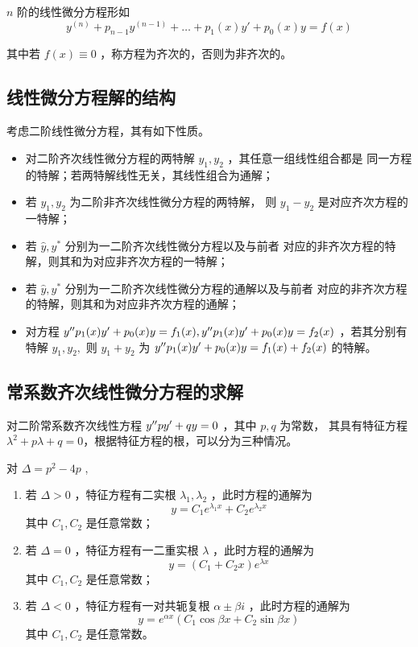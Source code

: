 $ n $ 阶的线性微分方程形如$$
    y^{(n)}+p_{n-1}y^{(n-1)} + \dots + p_1(x)y'+p_0(x)y = f(x)
$$ 

其中若 $ f(x)\equiv 0 $ ，称方程为齐次的，否则为非齐次的。

\subsection{线性微分方程解的结构}

考虑二阶线性微分方程，其有如下性质。

\begin{itemize}
    \item 对二阶齐次线性微分方程的两特解 $ y_1,y_2 $ ，其任意一组线性组合都是
    同一方程的特解；若两特解线性无关，其线性组合为通解；
    \item 若 $ y_1,y_2 $ 为二阶非齐次线性微分方程的两特解，
    则 $ y_1-y_2 $ 是对应齐次方程的一特解；
    \item 若 $ \hat y,y^* $ 分别为一二阶齐次线性微分方程以及与前者
    对应的非齐次方程的特解，则其和为对应非齐次方程的一特解；
    \item 若 $ \hat y,y^* $ 分别为一二阶齐次线性微分方程的通解以及与前者
    对应的非齐次方程的特解，则其和为对应非齐次方程的通解；
    \item 对方程 $ y^{\prime\prime} p_1(x)y'+p_0(x)y = f_1(x),y^{\prime\prime} p_1(x)y'+p_0(x)y = f_2(x) $
    ，若其分别有特解 $ y_1,y_2, $ 则 $ y_1+y_2 $ 为 $ y^{\prime\prime} p_1(x)y'+p_0(x)y = f_1(x)+f_2(x) $ 的特解。
\end{itemize}

\subsection{常系数齐次线性微分方程的求解}

对二阶常系数齐次线性方程 $ y^{\prime\prime} py'+qy = 0 $ ，其中 $ p,q $ 为常数，
其具有特征方程 $ \lambda^2+p\lambda+q = 0 $，根据特征方程的根，可以分为三种情况。

对 $ \Delta = p^2 - 4p $ ,
\begin{enumerate}
    \item 若 $ \Delta > 0 $ ，特征方程有二实根 $ \lambda_1,\lambda_2 $ ，此时方程的通解为$$
        y = C_1e^{\lambda_1x}+C_2e^{\lambda_2x}
    $$ 其中 $ C_1,C_2 $ 是任意常数；
    \item 若 $ \Delta = 0 $ ，特征方程有一二重实根 $ \lambda $ ，此时方程的通解为$$
        y = (C_1+C_2 x)e^{\lambda x}
    $$ 其中 $ C_1,C_2 $ 是任意常数；
    \item 若 $ \Delta < 0 $ ，特征方程有一对共轭复根 $ \alpha\pm\beta i $ ，此时方程的通解为$$
        y = e^{\alpha x}\left(C_1\cos \beta x + C_2 \sin \beta x\right)
    $$ 其中 $ C_1,C_2 $ 是任意常数。
\end{enumerate}

